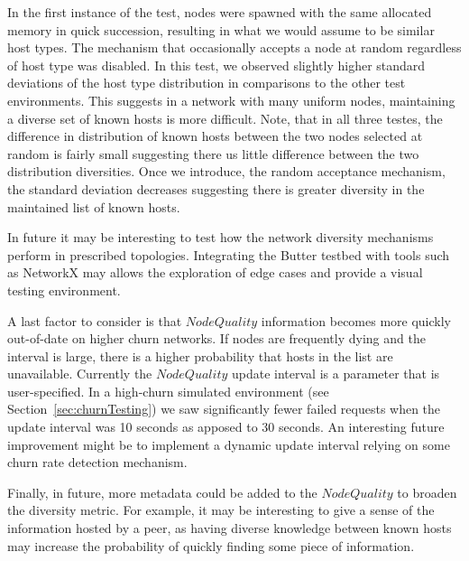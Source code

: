 In the first instance of the test, nodes were spawned with the same allocated memory in quick succession, resulting in what we would assume to be similar host types. The mechanism that occasionally accepts a node at random regardless of host type was disabled. In this test, we observed slightly higher standard deviations of the host type distribution in comparisons to the other test environments. This suggests in a network with many uniform nodes, maintaining a diverse set of known hosts is more difficult. Note, that in all three testes, the difference in distribution of known hosts between the two nodes selected at random is fairly small suggesting there us little difference between the two distribution diversities. Once we introduce, the random acceptance mechanism, the standard deviation decreases suggesting there is greater diversity in the maintained list of known hosts.

In future it may be interesting to test how the network diversity mechanisms perform in prescribed topologies. Integrating the Butter testbed with tools such as NetworkX\cite{networkx2022networx, orda2019efficient} may allows the exploration of edge cases and provide a visual testing environment.

A last factor to consider is that $NodeQuality$ information becomes more quickly out-of-date on higher churn networks. If nodes are frequently dying and the interval is large, there is a higher probability that hosts in the list are unavailable. Currently the $NodeQuality$ update interval is a parameter that is user-specified. In a high-churn simulated environment (see Section~\ref{sec:churnTesting}) we saw significantly fewer failed requests when the update interval was 10 seconds as apposed to 30 seconds. An interesting future improvement might be to implement a dynamic update interval relying on some churn rate detection mechanism.




Finally, in future, more metadata could be added to the $NodeQuality$ to broaden the diversity metric. For example, it may be interesting to give a sense of the information hosted by a peer, as having diverse knowledge between known hosts may increase the probability of quickly finding some piece of information.
